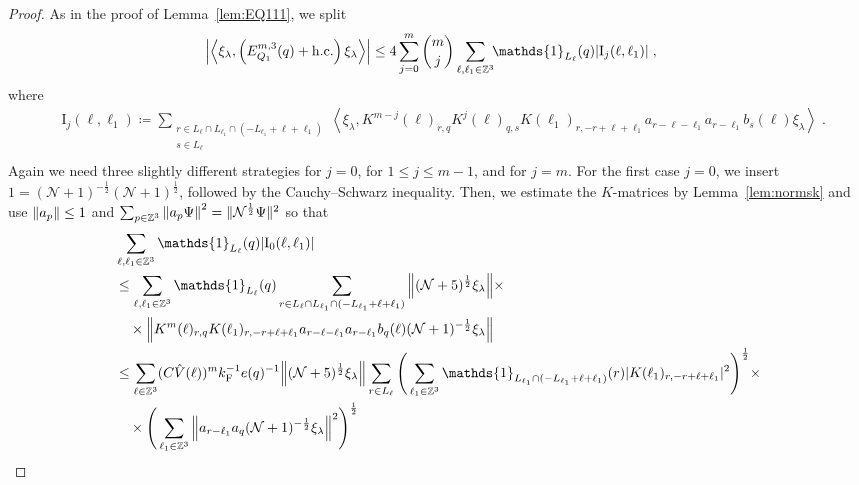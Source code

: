 \documentclass[12pt,a4paper]{article}
\numberwithin{equation}{section}
\newcommand{\cN}{\mathcal{N}}
\newcommand{\1}{\mathbb{I}}
\newcommand{\F}{\mathrm{F}}
\newcommand{\I}{\mathrm{I}}
\newcommand{\kF}{k_\F}
\newcommand{\Zstar}{\mathbb{Z}^3} %
\newcommand{\Z}{\mathbb{Z}}
\newcommand{\NN}{\mathcal{N}}
\newcommand{\half}{\frac{1}{2}}
\newcommand{\eva}[1]{\left\langle #1 \right\rangle}
\theoremstyle{plain}
\theoremstyle{definition}
\theoremstyle{remark}
\theoremstyle{plain}
\theoremstyle{definition}
\theoremstyle{remark}
\begin{document}
\begin{proof}
As in the proof of Lemma~\ref{lem:EQ111}, we split
\begin{equation} \label{eq:EQ1121}
\begin{aligned}
	& \abs{\eva{\xi_\lambda,\left(E^{m,3}_{Q_1}(q) +  \mathrm{h.c.}\right) \xi_\lambda }}
	\le 4 \sum_{j=0}^m {{m}\choose j} \sum_{\ell,\ell_1 \in \Zstar}\!\! \mathds{1}_{L_\ell}(q) |\I_j(\ell, \ell_1)| \;,
	\end{aligned}
\end{equation}
where
\begin{equation}
\begin{aligned}
	& \I_j(\ell, \ell_1)
	\coloneq \sum_{\substack{r\in L_{\ell} \cap L_{\ell_1} \cap (-L_{\ell_1}+\ell+\ell_1)\\ s \in L_{\ell}}}
		\eva{\xi_\lambda, K^{m-j}(\ell)_{r,q} K^{j}(\ell)_{q,s}K(\ell_1)_{r,-r+\ell+\ell_1} a_{r-\ell-\ell_1} a_{r-\ell_1} b_{s}(\ell) \xi_\lambda} \;. \\
\end{aligned}
\end{equation}
Again we need three slightly different strategies for $ j = 0 $, for $ 1 \le j \le m-1 $, and for $ j = m $. For the first case $ j = 0 $, we insert $1 = (\NN+1)^{-\half}(\NN+1)^{\half}$, followed by the Cauchy--Schwarz inequality. Then, we estimate the $ K $-matrices by Lemma~\ref{lem:normsk} and use $ \norm{a_p} \le 1 $ and $ \sum_{p \in \Z^3} \norm{a_p \Psi}^2 = \Vert \cN^\half \Psi \Vert^2 $ so that
\begin{align}
	&\sum_{\ell,\ell_1 \in \Zstar} \mathds{1}_{L_\ell}(q) |\I_0(\ell, \ell_1)| \nonumber\\
	&\leq \sum_{\ell,\ell_1 \in \Zstar} \mathds{1}_{L_\ell}(q) \sum\limits_{\substack{r\in L_{\ell} \cap L_{\ell_1} \cap (-L_{\ell_1}+\ell+\ell_1)}}
		\norm{ (\NN+5)^{\half} \xi_\lambda} \times \nonumber\\
	&\quad \times \norm{ K^m(\ell )_{r,q} K(\ell_1)_{r,-r+\ell+\ell_1} a_{r-\ell-\ell_1} a_{r-\ell_1} b_{q}(\ell) (\NN+1)^{-\half} \xi_\lambda }\nonumber\\
	 &\leq \sum_{\ell \in \Zstar} (C \hat{V}(\ell))^m \kF^{-1} e(q)^{-1}
	 	\norm{ (\NN+5)^{\half} \xi_\lambda}
	 	\sum_{r \in L_\ell} \Bigg( \sum_{\ell_1 \in \Zstar} \mathds{1}_{L_{\ell_1} \cap (-L_{\ell_1}+\ell+\ell_1)}(r) |K(\ell_1)_{r,-r+\ell+\ell_1}|^2 \Bigg)^{\half} \times \nonumber\\
	 &\quad \times \Bigg( \sum\limits_{\ell_1 \in \Z^3} \norm{ a_{r-\ell_1} a_q (\NN+1)^{-\half} \xi_\lambda }^2 \Bigg)^\half \nonumber\\

\end{align}
\end{proof}
\end{document}
